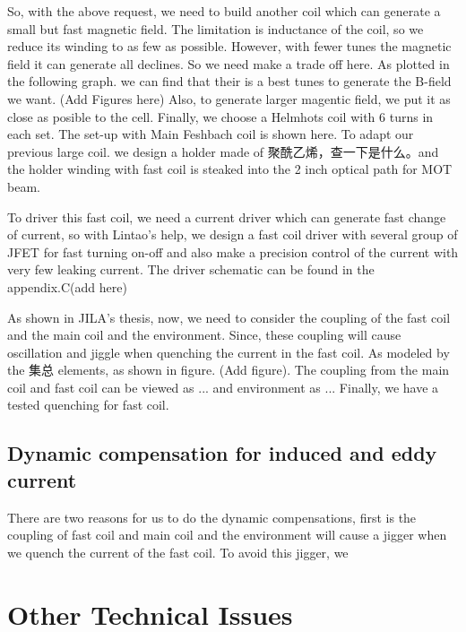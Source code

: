 So, with the above request, we need to build another coil which can generate a small but fast magnetic field. The limitation is inductance of the coil, so we reduce its winding to as few as possible. However, with fewer tunes the magnetic field it can generate all declines. So we need make a trade off here. As plotted in the following graph. we can find that their is a best tunes to generate the B-field we want. (Add Figures here) Also, to generate larger magentic field, we put it as close as posible to the cell. Finally, we choose a Helmhots coil with 6 turns in each set. The set-up with Main Feshbach coil is shown here. To adapt our previous large coil. we design a holder made of 聚酰乙烯，查一下是什么。and the holder winding with fast coil is steaked into the 2 inch optical path for MOT beam. 

To driver this fast coil, we need a current driver which can generate fast change of current, so with Lintao's help, we design a fast coil driver with several group of JFET for fast turning on-off and also make a precision control of the current with very few leaking current. The driver schematic can be found in the appendix.C(add here)

As shown in JILA's thesis, now, we need to consider the coupling of the fast coil and the main coil and the environment. Since, these coupling will cause oscillation and jiggle when quenching the current in the fast coil. As modeled by the 集总 elements, as shown in figure. (Add figure). The coupling from the main coil and fast coil can be viewed as ... and environment as ... Finally, we have a tested quenching for fast coil.



\subsection{Dynamic compensation for induced and eddy current}
There are two reasons for us to do the dynamic compensations, first is the coupling of fast coil and main coil and the environment will cause a jigger when we quench the current of the fast coil. To avoid this jigger, we 


\section{Other Technical Issues}
